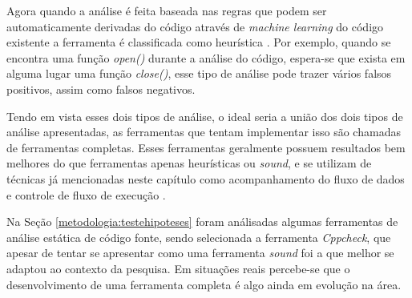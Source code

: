 Agora quando a análise é feita baseada nas regras que podem ser automaticamente
derivadas do código através de \textit{machine learning} do código existente a
ferramenta é classificada como heurística \cite{paul:2001}. Por exemplo, quando
se encontra uma função \textit{open()} durante a análise do código, espera-se
que exista em alguma lugar uma função \textit{close()}, esse tipo de análise
pode trazer vários falsos positivos, assim como falsos negativos.

Tendo em vista esses dois tipos de análise, o ideal seria a união dos dois tipos
de análise apresentadas, as ferramentas que tentam implementar isso são chamadas
de ferramentas completas. Esses ferramentas geralmente possuem resultados bem
melhores do que ferramentas apenas heurísticas ou \textit{sound}, e se utilizam
de técnicas já mencionadas neste capítulo como acompanhamento do fluxo de dados
e controle de fluxo de execução \cite{paul:2001}.

Na Seção \ref{metodologia:testehipoteses} foram análisadas algumas ferramentas
de análise estática de código fonte, sendo selecionada a ferramenta
\textit{Cppcheck}, que apesar de tentar se apresentar como uma ferramenta
\textit{sound} foi a que melhor se adaptou ao contexto da pesquisa. Em situações
reais percebe-se que o desenvolvimento de uma ferramenta completa é algo ainda
em evolução na área.
